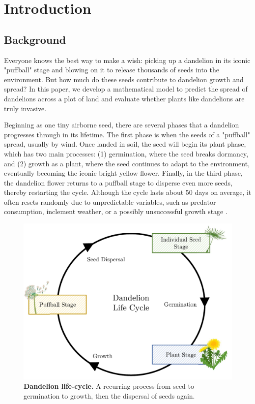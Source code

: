 \section{Introduction}

\subsection{Background}
Everyone knows the best way to make a wish: picking up a dandelion in its iconic "puffball" stage and blowing on it to release thousands of seeds into the environment. But how much do these seeds contribute to dandelion growth and spread? In this paper, we develop a mathematical model to predict the spread of dandelions across a plot of land and evaluate whether plants like dandelions are truly invasive.

Beginning as one tiny airborne seed, there are several phases that a dandelion progresses through in its lifetime. The first phase is when the seeds of a "puffball" spread, usually by wind. Once landed in soil, the seed will begin its plant phase, which has two main processes: (1) germination, where the seed breaks dormancy, and (2) growth as a plant, where the seed continues to adapt to the environment, eventually becoming the iconic bright yellow flower. Finally, in the third phase, the dandelion flower returns to a puffball stage to disperse even more seeds, thereby restarting the cycle. Although the cycle lasts about 50 days on average, it often resets randomly due to unpredictable variables, such as predator consumption, inclement weather, or a possibly unsuccessful growth stage \cite{stewart-wade_biology_2002}.

\begin{figure}[h!]
\centering
    \includegraphics[scale=0.5]{figures/dandelionlifecycle.pdf}
    \captionsetup{width=0.9\textwidth}
    \caption{\textbf{Dandelion life-cycle.} A recurring process from seed to germination to growth, then the dispersal of seeds again.}
    \label{fig:dandelionlifecycle}
\end{figure}

